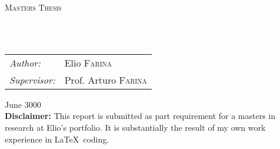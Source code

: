 \begin{titlepage}
    \begin{center}
    {\scshape\LARGE \univname\par}\vspace{1.5cm} %
    \textsc{\Large Masters Thesis}\\[0.5cm] %

    \HRule \\[0.4cm] %
    {\huge \bfseries \ttitle\par}\vspace{0.4cm} %
    \HRule \\[1.5cm] %

    \vfill
        {\large\begin{tabular}{@{}ll}
            \itshape Author:                 & Elio \textsc{Farina} \\
            \itshape Supervisor:             & Prof. Arturo \textsc{Farina} \\
        \end{tabular}}

    \vfill
    {\large June 3000}\\

    \vfill
    {\footnotesize \textbf{Disclaimer:} This report is submitted as part requirement for a masters in research at Elio's portfolio. It is substantially the result of my own work experience in \LaTeX\ coding.}
    \end{center}
\end{titlepage}